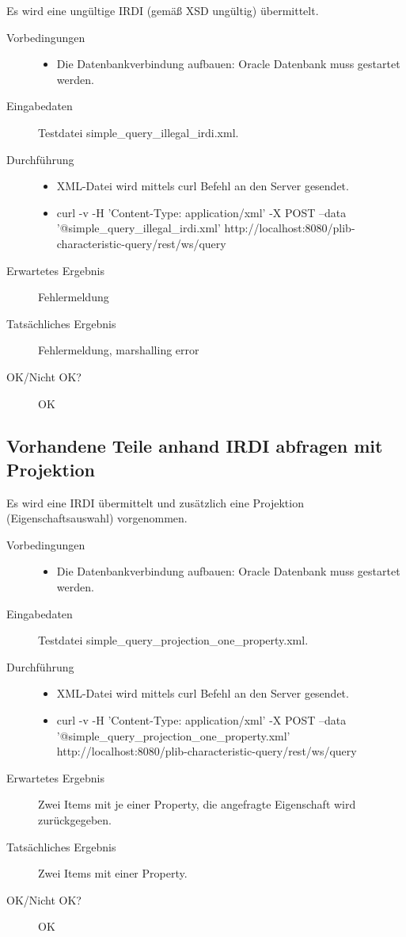 Es wird eine ungültige IRDI (gemäß XSD ungültig) übermittelt. 

\begin{description}
\item[Vorbedingungen] 
  \begin{itemize}
   \item Die Datenbankverbindung aufbauen: Oracle Datenbank muss gestartet werden.
  \end{itemize}
\item[Eingabedaten] Testdatei simple\_query\_illegal\_irdi.xml. 
\item[Durchführung]
   \begin{itemize}
   \item XML-Datei wird mittels curl Befehl an den Server gesendet.
   \item curl -v -H 'Content-Type: application/xml' -X POST --data '@simple\_query\_illegal\_irdi.xml' http://localhost:8080/plib-characteristic-query/rest/ws/query
  \end{itemize}
\item[Erwartetes Ergebnis] Fehlermeldung
\item[Tatsächliches Ergebnis] Fehlermeldung, marshalling error
\item[OK/Nicht OK?] OK
\end{description}

\subsection{Vorhandene Teile anhand IRDI abfragen mit Projektion}

Es wird eine IRDI übermittelt und zusätzlich eine Projektion (Eigenschaftsauswahl) vorgenommen.

\begin{description}
\item[Vorbedingungen] 
  \begin{itemize}
   \item Die Datenbankverbindung aufbauen: Oracle Datenbank muss gestartet werden.
  \end{itemize}
\item[Eingabedaten] Testdatei simple\_query\_projection\_one\_property.xml. 
\item[Durchführung]
   \begin{itemize}
   \item XML-Datei wird mittels curl Befehl an den Server gesendet.
   \item curl -v -H 'Content-Type: application/xml' -X POST --data '@simple\_query\_projection\_one\_property.xml' http://localhost:8080/plib-characteristic-query/rest/ws/query
  \end{itemize}
\item[Erwartetes Ergebnis] Zwei Items mit je einer Property, die angefragte Eigenschaft wird zurückgegeben. 
\item[Tatsächliches Ergebnis] Zwei Items mit einer Property. 
\item[OK/Nicht OK?] OK
\end{description}


